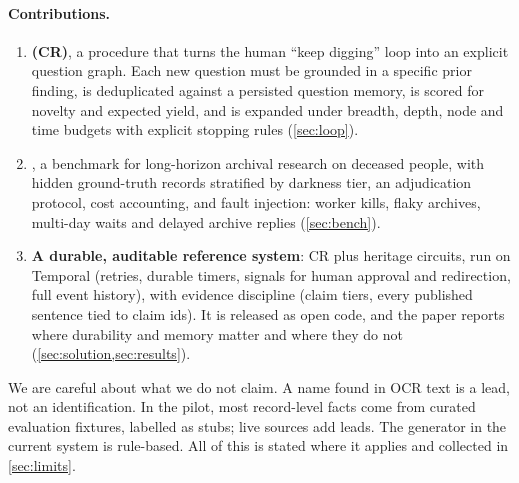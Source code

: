 \paragraph{Contributions.}
\begin{enumerate}
\item \textbf{\CR (CR)}, a procedure that turns the human ``keep digging'' loop into an explicit question graph. Each new question must be grounded in a specific prior finding, is deduplicated against a persisted question memory, is scored for novelty and expected yield, and is expanded under breadth, depth, node and time budgets with explicit stopping rules (\cref{sec:loop}).
\item \textbf{\bench}, a benchmark for long-horizon archival research on deceased people, with hidden ground-truth records stratified by darkness tier, an adjudication protocol, cost accounting, and fault injection: worker kills, flaky archives, multi-day waits and delayed archive replies (\cref{sec:bench}).
\item \textbf{A durable, auditable reference system}: CR plus heritage circuits, run on Temporal (retries, durable timers, signals for human approval and redirection, full event history), with evidence discipline (claim tiers, every published sentence tied to claim ids). It is released as open code, and the paper reports where durability and memory matter and where they do not (\cref{sec:solution,sec:results}).
\end{enumerate}

\noindent We are careful about what we do not claim. A name found in OCR text is a lead, not an identification. In the pilot, most record-level facts come from curated evaluation fixtures, labelled as stubs; live sources add leads. The generator in the current system is rule-based. All of this is stated where it applies and collected in \cref{sec:limits}.
